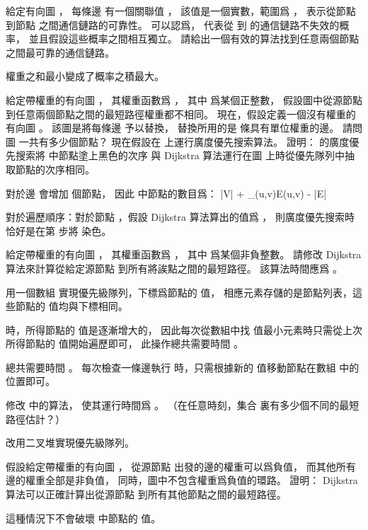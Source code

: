 \startANSWER
{}
\stopANSWER

\startEXERCISE
給定有向圖 ，
每條邊  有一個關聯值 ，
該值是一個實數，範圍爲 ，
表示從節點  到節點  之間通信鏈路的可靠性。
可以認爲，  代表從  到  的通信鏈路不失效的概率，
並且假設這些概率之間相互獨立。
請給出一個有效的算法找到任意兩個節點之間最可靠的通信鏈路。
\stopEXERCISE

\startANSWER
權重之和最小變成了概率之積最大。
\stopANSWER

\startEXERCISE
給定帶權重的有向圖 ，
其權重函數爲 ，
其中  爲某個正整數，
假設圖中從源節點  到任意兩個節點之間的最短路徑權重都不相同。
現在，假設定義一個沒有權重的有向圖 。
該圖是將每條邊  予以替換，
替換所用的是  條具有單位權重的邊。
請問圖  一共有多少個節點？
現在假設在  上運行廣度優先搜索算法。
證明：  的廣度優先搜索將  中節點塗上黑色的次序
與 Dijkstra 算法運行在圖  上時從優先隊列中抽取節點的次序相同。
\stopEXERCISE

\startANSWER
對於邊  會增加  個節點，
因此  中節點的數目爲：
\startformula
|V| + \sum_{(u,v)\in E}\omega(u,v) - |E|
\stopformula

對於遍歷順序：對於節點 ，假設 Dijkstra 算法算出的值爲 ，
則廣度優先搜索時恰好是在第  步將  染色。
\stopANSWER

\startEXERCISE[exercise:24.3-8]
給定帶權重的有向圖 ，
其權重函數爲 ，
其中  爲某個非負整數。
請修改 Dijkstra 算法來計算從給定源節點  到所有將誒點之間的最短路徑。
該算法時間應爲 。
\stopEXERCISE

\startANSWER
用一個數組  實現優先級隊列，下標爲節點的  值，
相應元素存儲的是節點列表，這些節點的  值均與下標相同。

 時，所得節點的  值是逐漸增大的，
因此每次從數組中找  值最小元素時只需從上次所得節點的  值開始遍歷即可，
此操作總共需要時間 。

 總共需要時間 。
每次檢查一條邊執行  時，只需根據新的  值移動節點在數組  中的位置即可。
\stopANSWER

\startEXERCISE
修改 中的算法，
使其運行時間爲 。
（\hint 在任意時刻，集合  裏有多少個不同的最短路徑估計？）
\stopEXERCISE

\startANSWER
改用二叉堆實現優先級隊列。
\stopANSWER

\startEXERCISE
假設給定帶權重的有向圖 ，
從源節點  出發的邊的權重可以爲負值，
而其他所有邊的權重全部是非負值，
同時，圖中不包含權重爲負值的環路。
證明： Dijkstra 算法可以正確計算出從源節點  到所有其他節點之間的最短路徑。
\stopEXERCISE

\startANSWER
這種情況下不會破壞  中節點的  值。
\stopANSWER

\stopsection
